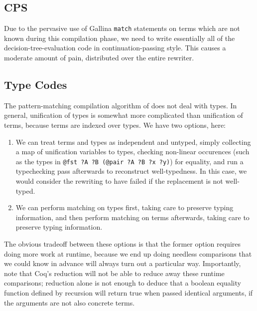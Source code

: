 \subsection{CPS}\label{sec:rewriting-more:pre-reduction:cps}
Due to the pervasive use of Gallina \texttt{match} statements on terms which are not known during this compilation phase, we need to write essentially all of the decision-tree-evaluation code in continuation-passing style.
This causes a moderate amount of pain, distributed over the entire rewriter.

\subsection{Type Codes}\label{sec:rewriting-more:pre-reduction:type-codes}
The pattern-matching compilation algorithm of \textcite{Aehlig} does not deal with types.
In general, unification of types is somewhat more complicated than unification of terms, because terms are indexed over types.
We have two options, here:
\begin{enumerate}
\item
  We can treat terms and types as independent and untyped, simply collecting a map of unification variables to types, checking non-linear occurences (such as the types in \texttt{@fst ?A ?B (@pair ?A ?B ?x ?y)}) for equality, and run a typechecking pass afterwards to reconstruct well-typedness.
  In this case, we would consider the rewriting to have failed if the replacement is not well-typed.
\item
  We can perform matching on types first, taking care to preserve typing information, and then perform matching on terms afterwards, taking care to preserve typing information.
\end{enumerate}

The obvious tradeoff between these options is that the former option requires doing more work at runtime, because we end up doing needless comparisons that we could know in advance will always turn out a particular way.
Importantly, note that Coq's reduction will not be able to reduce away these runtime comparisons; reduction alone is not enough to deduce that a boolean equality function defined by recursion will return true when passed identical arguments, if the arguments are not also concrete terms.
%
%

